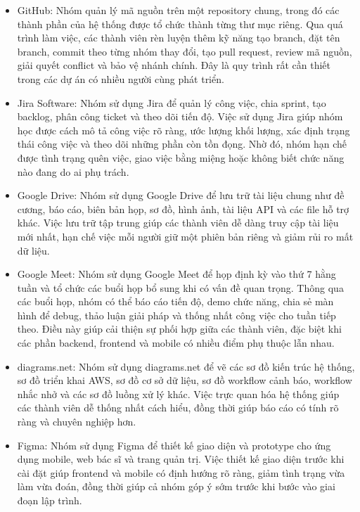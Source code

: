 \begin{itemize}
    \item GitHub: Nhóm quản lý mã nguồn trên một repository chung, trong đó các thành phần của hệ thống được tổ chức thành từng thư mục riêng. Qua quá trình làm việc, các thành viên rèn luyện thêm kỹ năng tạo branch, đặt tên branch, commit theo từng nhóm thay đổi, tạo pull request, review mã nguồn, giải quyết conflict và bảo vệ nhánh chính. Đây là quy trình rất cần thiết trong các dự án có nhiều người cùng phát triển.

    \item Jira Software: Nhóm sử dụng Jira để quản lý công việc, chia sprint, tạo backlog, phân công ticket và theo dõi tiến độ. Việc sử dụng Jira giúp nhóm học được cách mô tả công việc rõ ràng, ước lượng khối lượng, xác định trạng thái công việc và theo dõi những phần còn tồn đọng. Nhờ đó, nhóm hạn chế được tình trạng quên việc, giao việc bằng miệng hoặc không biết chức năng nào đang do ai phụ trách.

    \item Google Drive: Nhóm sử dụng Google Drive để lưu trữ tài liệu chung như đề cương, báo cáo, biên bản họp, sơ đồ, hình ảnh, tài liệu API và các file hỗ trợ khác. Việc lưu trữ tập trung giúp các thành viên dễ dàng truy cập tài liệu mới nhất, hạn chế việc mỗi người giữ một phiên bản riêng và giảm rủi ro mất dữ liệu.

    \item Google Meet: Nhóm sử dụng Google Meet để họp định kỳ vào thứ 7 hằng tuần và tổ chức các buổi họp bổ sung khi có vấn đề quan trọng. Thông qua các buổi họp, nhóm có thể báo cáo tiến độ, demo chức năng, chia sẻ màn hình để debug, thảo luận giải pháp và thống nhất công việc cho tuần tiếp theo. Điều này giúp cải thiện sự phối hợp giữa các thành viên, đặc biệt khi các phần backend, frontend và mobile có nhiều điểm phụ thuộc lẫn nhau.

    \item diagrams.net: Nhóm sử dụng diagrams.net để vẽ các sơ đồ kiến trúc hệ thống, sơ đồ triển khai AWS, sơ đồ cơ sở dữ liệu, sơ đồ workflow cảnh báo, workflow nhắc nhở và các sơ đồ luồng xử lý khác. Việc trực quan hóa hệ thống giúp các thành viên dễ thống nhất cách hiểu, đồng thời giúp báo cáo có tính rõ ràng và chuyên nghiệp hơn.

    \item Figma: Nhóm sử dụng Figma để thiết kế giao diện và prototype cho ứng dụng mobile, web bác sĩ và trang quản trị. Việc thiết kế giao diện trước khi cài đặt giúp frontend và mobile có định hướng rõ ràng, giảm tình trạng vừa làm vừa đoán, đồng thời giúp cả nhóm góp ý sớm trước khi bước vào giai đoạn lập trình.
\end{itemize}

